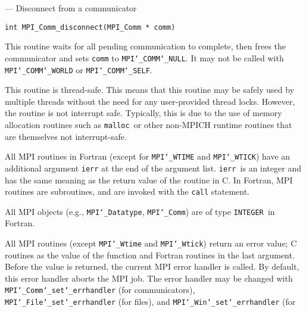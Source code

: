 \startmanpage
{}
--- Disconnect from a communicator 
\startvb\begin{verbatim}
int MPI_Comm_disconnect(MPI_Comm * comm)

\end{verbatim}
\endvb

\par
{}
This routine waits for all pending communication to complete, then frees the
communicator and sets {\tt comm} to {\tt MPI{\tt \char`\_}COMM{\tt \char`\_}NULL}.  It may not be called
with {\tt MPI{\tt \char`\_}COMM{\tt \char`\_}WORLD} or {\tt MPI{\tt \char`\_}COMM{\tt \char`\_}SELF}.
\par
{}
\par
This routine is thread-safe.  This means that this routine may be
safely used by multiple threads without the need for any user-provided
thread locks.  However, the routine is not interrupt safe.  Typically,
this is due to the use of memory allocation routines such as {\tt malloc
}or other non-MPICH runtime routines that are themselves not interrupt-safe.
\par
{}
All MPI routines in Fortran (except for {\tt MPI{\tt \char`\_}WTIME} and {\tt MPI{\tt \char`\_}WTICK}) have
an additional argument {\tt ierr} at the end of the argument list.  {\tt ierr
}is an integer and has the same meaning as the return value of the routine
in C.  In Fortran, MPI routines are subroutines, and are invoked with the
{\tt call} statement.
\par
All MPI objects (e.g., {\tt MPI{\tt \char`\_}Datatype}, {\tt MPI{\tt \char`\_}Comm}) are of type {\tt INTEGER
}in Fortran.
\par
{}
\par
All MPI routines (except {\tt MPI{\tt \char`\_}Wtime} and {\tt MPI{\tt \char`\_}Wtick}) return an error value;
C routines as the value of the function and Fortran routines in the last
argument.  Before the value is returned, the current MPI error handler is
called.  By default, this error handler aborts the MPI job.  The error handler
may be changed with {\tt MPI{\tt \char`\_}Comm{\tt \char`\_}set{\tt \char`\_}errhandler} (for communicators),
{\tt MPI{\tt \char`\_}File{\tt \char`\_}set{\tt \char`\_}errhandler} (for files), and {\tt MPI{\tt \char`\_}Win{\tt \char`\_}set{\tt \char`\_}errhandler} (for
